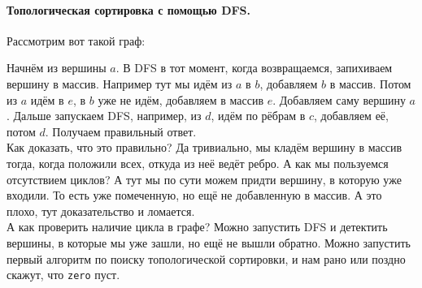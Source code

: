 \documentclass{article}
\begin{document}
    \paragraph{Топологическая сортировка с помощью DFS.}
    Рассмотрим вот такой граф:
    \begin{figure}[H]
    \end{figure}\noindent
    Начнём из вершины $a$. В DFS в тот момент, когда возвращаемся, запихиваем вершину в массив. Например тут мы идём из $a$ в $b$, добавляем $b$ в массив. Потом из $a$ идём в $e$, в $b$ уже не идём, добавляем в массив $e$. Добавляем саму вершину $a$. Дальше запускаем DFS, например, из $d$, идём по рёбрам в $c$, добавляем её, потом $d$. Получаем правильный ответ.\\
    Как доказать, что это правильно? Да тривиально, мы кладём вершину в массив тогда, когда положили всех, откуда из неё ведёт ребро. А как мы пользуемся отсутствием циклов? А тут мы по сути можем придти вершину, в которую уже входили. То есть уже помеченную, но ещё не добавленную в массив. А это плохо, тут доказательство и ломается.\\
    А как проверить наличие цикла в графе? Можно запустить DFS и детектить вершины, в которые мы уже зашли, но ещё не вышли обратно. Можно запустить первый алгоритм по поиску топологической сортировки, и нам рано или поздно скажут, что \texttt{zero} пуст.
\end{document}
